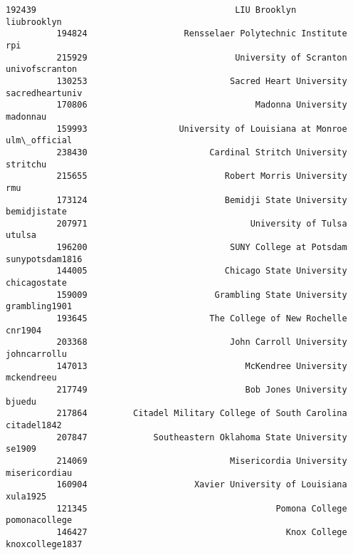 \documentclass[11pt]{article}
\begin{document}
\begin{Verbatim}[commandchars=\\\{\}]
          192439                                       LIU Brooklyn      liubrooklyn   
          194824                   Rensselaer Polytechnic Institute              rpi   
          215929                             University of Scranton   univofscranton   
          130253                            Sacred Heart University  sacredheartuniv   
          170806                                 Madonna University         madonnau   
          159993                  University of Louisiana at Monroe     ulm\_official   
          238430                        Cardinal Stritch University         stritchu   
          215655                           Robert Morris University              rmu   
          173124                           Bemidji State University     bemidjistate   
          207971                                University of Tulsa           utulsa   
          196200                            SUNY College at Potsdam  sunypotsdam1816   
          144005                           Chicago State University     chicagostate   
          159009                         Grambling State University    grambling1901   
          193645                        The College of New Rochelle          cnr1904   
          203368                            John Carroll University     johncarrollu   
          147013                               McKendree University       mckendreeu   
          217749                               Bob Jones University           bjuedu   
          217864         Citadel Military College of South Carolina      citadel1842   
          207847             Southeastern Oklahoma State University           se1909   
          214069                            Misericordia University    misericordiau   
          160904                     Xavier University of Louisiana         xula1925   
          121345                                     Pomona College    pomonacollege   
          146427                                       Knox College  knoxcollege1837   
          

\end{Verbatim}
\end{document}
